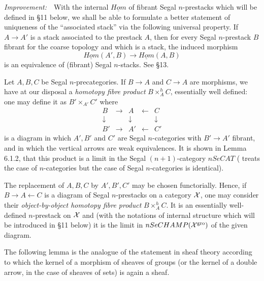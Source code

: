 {\em Improvement:} \,\, With the internal $\underline{Hom}$ of
fibrant Segal
$n$-prestacks which will be defined in \S 11 below, we shall be able to formulate a
better statement of uniqueness of the ``associated stack'' via the following
universal property. If $A\rightarrow A'$ is
a stack associated to the prestack $A$, then for every Segal $n$-prestack $B$
fibrant for the coarse topology and which is a stack, the induced
morphism
$$
\underline{Hom}(A',B)\rightarrow \underline{Hom}(A,B)
$$
is an equivalence of (fibrant) Segal $n$-stacks.
See \S 13.




Let $A,B,C$ be Segal $n$-precategories. If $B\rightarrow A$
and $C\rightarrow A$ are morphisms, we have at our disposal a {\em homotopy
fibre product} $B\times ^h_AC$, essentially well defined: one may define it as
$B'\times _{A'}C'$ where
$$
\begin{array}{ccccc}
B&\rightarrow & A & \leftarrow & C \\
\downarrow && \downarrow && \downarrow \\
B'&\rightarrow & A' & \leftarrow & C'
\end{array}
$$
is a diagram in which $A',B'$ and $C'$ are Segal
$n$-categories with
$B'\rightarrow A'$ fibrant, and in which the vertical arrows are
weak
equivalences. It is shown in \cite{limits} Lemma 6.1.2, that this product is a
limit in the Segal $(n+1)$-category $nSeCAT$ (\cite{limits} treats the case of
$n$-categories but the case of Segal $n$-categories is identical).

The replacement of $A,B,C$ by
$A',B',C'$ may be chosen functorially. Hence, if $B\rightarrow
A\leftarrow C$ is a diagram of Segal $n$-prestacks on a category
${\cal X}$, one may consider their {\em object-by-object homotopy fibre
product}
$B\times ^h_AC$. It is an essentially well-defined $n$-prestack on
${\cal X}$ and (with the notations of internal structure which will be introduced in
\S 11
below) it is the limit in $nSeCHAMP ({\cal X} ^{\rm gro})$ of the
given diagram.

The following lemma is the analogue of the statement in sheaf theory according to which
the kernel of a morphism of sheaves of groups (or the kernel of a double
arrow, in the case of sheaves of sets) is again a sheaf.

